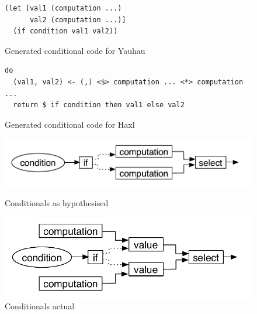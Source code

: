 \begin{figure}
\begin{verbatim}
(let [val1 (computation ...)
      val2 (computation ...)]
  (if condition val1 val2))
\end{verbatim}
\caption{Generated conditional code for Yauhau}
\label{fig:generated-conditional-yauhau}
\begin{verbatim}
do
  (val1, val2) <- (,) <$> computation ... <*> computation ...
  return $ if condition then val1 else val2
\end{verbatim}
\caption{Generated conditional code for Haxl}
\label{fig:generated-conditional-haxl}
\end{figure}

\begin{figure}
  \includegraphics[width=\textwidth]{../Figures/if-hypothesised}
  \caption{Conditionals as hypothesised}
  \label{fig:if-graph-hypothesised}
  \includegraphics[width=\textwidth]{../Figures/if-in-reality}
  \caption{Conditionals actual}
  \label{fig:if-graph-actual}
\end{figure}

